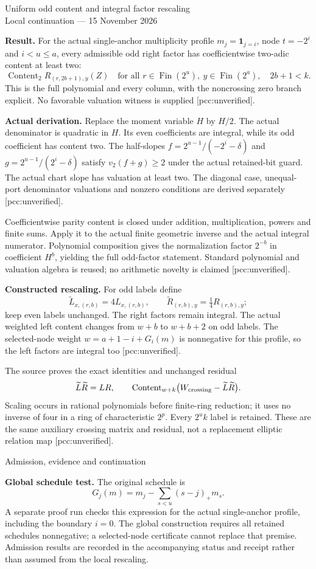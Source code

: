 \documentclass[10pt]{article}
\begin{document}
\begin{center}{\Large Uniform odd content and integral factor rescaling}\\[4pt]
Local continuation --- 15 November 2026\end{center}
\textbf{Result.} For the actual single-anchor multiplicity profile
$m_j=\mathbf1_{j=i}$, node $t=-2^i$ and $i<u\le a$, every admissible
odd right factor has coefficientwise two-adic content at least two:
\[
 \operatorname{Content}_2 R_{(r,2b+1),y}(Z)
 \quad\text{for all }r\in\operatorname{Fin}(2^u),\ y\in\operatorname{Fin}(2^a),\quad 2b+1<k.
\]
This is the full polynomial and every column, with the noncrossing zero
branch explicit. No favorable valuation witness is supplied [pcc:unverified].

\textbf{Actual derivation.} Replace the moment variable $H$ by $H/2$.
The actual denominator is quadratic in $H$. Its even coefficients are
integral, while its odd coefficient has content two. The half-slopes
$f=2^{u-1}/(-2^i-\delta)$ and $g=2^{u-1}/(2^i-\delta)$ satisfy
$v_2(f+g)\ge2$ under the actual retained-bit guard. The actual chart slope
has valuation at least two. The diagonal case, unequal-port denominator
valuations and nonzero conditions are derived separately [pcc:unverified].

Coefficientwise parity content is closed under addition, multiplication,
powers and finite sums. Apply it to the actual finite geometric inverse
and the actual integral numerator. Polynomial composition gives the
normalization factor $2^{-b}$ in coefficient $H^b$, yielding the full
odd-factor statement. Standard polynomial and valuation algebra is reused;
no arithmetic novelty is claimed [pcc:unverified].

\textbf{Constructed rescaling.} For odd labels define
\[
 \widetilde L_{x,(r,b)}=4L_{x,(r,b)},\qquad
 \widetilde R_{(r,b),y}=\tfrac14R_{(r,b),y};
\]
keep even labels unchanged. The right factors remain integral. The actual
weighted left content changes from $w+b$ to $w+b+2$ on odd labels.
The selected-node weight $w=a+1-i+G_i(m)$ is nonnegative for this profile,
so the left factors are integral too [pcc:unverified].

The source proves the exact identities and unchanged residual
\[
 \widetilde L\widetilde R=LR,\qquad
 \operatorname{Content}_{w+k}\bigl(W_{\rm crossing}-\widetilde L\widetilde R\bigr).
\]
Scaling occurs in rational polynomials before finite-ring reduction; it
uses no inverse of four in a ring of characteristic $2^p$. Every
$2^u k$ label is retained. These are the same auxiliary crossing matrix
and residual, not a replacement elliptic relation map [pcc:unverified].
\newpage
\begin{center}{\Large Admission, evidence and continuation}\end{center}
\textbf{Global schedule test.} The original schedule is
\[
 G_j(m)=m_j-\sum_{s<u}(s-j)_+m_s.
\]
A separate proof run checks this expression for the actual single-anchor
profile, including the boundary $i=0$. The global construction requires
all retained schedules nonnegative; a selected-node certificate cannot
replace that premise. Admission results are recorded in the accompanying
status and receipt rather than assumed from the local rescaling.
\end{document}
